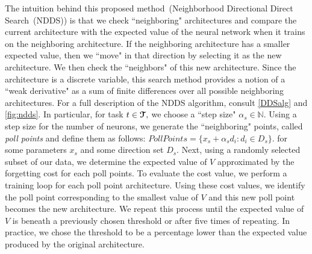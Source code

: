 The intuition behind this proposed method~(Neighborhood Directional Direct Search~(NDDS)) is that we check ``neighboring" architectures and compare the current architecture with the expected value of the neural network when it trains on the neighboring architecture. If the neighboring architecture has a smaller expected value, then we ``move" in that direction by selecting it as the new architecture. We then check the ``neighbors" of this new architecture. Since the architecture is a discrete variable, this search method provides a notion of a ``weak derivative" as a sum of finite differences over all possible neighboring architectures. For a full description of the NDDS algorithm, consult \cref{DDSalg} and \cref{fig:ndds}. In particular, for task $t\in \boldsymbol{\mathcal{T}},$ we choose a ``step size" $\alpha_s\in \mathbb{N}.$  Using a step size for the number of neurons, we generate the ``neighboring" points, called \textit{poll points} and define them as follows:
$Poll Points = \{x_s + \alpha_s d_i: d_i\in D_s\}.$
for some parameters $x_s$ and some direction set $D_s.$ Next, using a randomly selected subset of our data, we determine the expected value of $V$ approximated by the forgetting cost for each poll points. To evaluate the cost value, we perform a training loop for each poll point architecture. Using these cost values, we identify the poll point corresponding to the 
smallest value of $V$ and this new poll point becomes the new architecture. We repeat this process until the expected value of $V$ is beneath a previously chosen threshold or after five times of repeating. In practice, we chose the threshold to be a percentage lower than the expected value produced by the original architecture.



